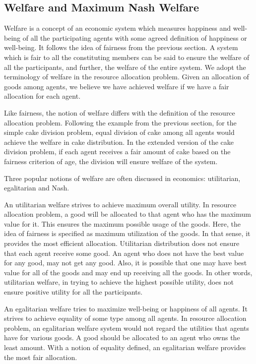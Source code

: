 \subsection{Welfare and Maximum Nash Welfare}
\label{section_welfare}
Welfare is a concept of an economic system which measures happiness and well-being of all the participating agents with some agreed definition of happiness or well-being. It follows the idea of fairness from the previous section. A system which is fair to all the constituting members can be said to ensure the welfare of all the participants, and further, the welfare of the entire system. We adopt the terminology of welfare in the resource allocation problem. Given an allocation of goods among agents, we believe we have achieved welfare if we have a fair allocation for each agent.

Like fairness, the notion of welfare differs with the definition of the resource allocation problem. Following the example from the previous section, for the simple cake division problem, equal division of cake among all agents would achieve the welfare in cake distribution. In the extended version of the cake division problem, if each agent receives a fair amount of cake based on the fairness criterion of age, the division will ensure welfare of the system.

Three popular notions of welfare are often discussed in economics: utilitarian, egalitarian and Nash.

An utilitarian welfare strives to achieve maximum overall utility. In resource allocation problem, a good will be allocated to that agent who has the maximum value for it. This ensures the maximum possible usage of the goods. Here, the idea of fairness is specified as maximum utilization of the goods. In that sense, it provides the most efficient allocation. Utilitarian distribution does not ensure that each agent receive some good. An agent who does not have the best value for any good, may not get any good. Also, it is possible that one may have best value for all of the goods and may end up receiving all the goods. In other words, utilitarian welfare, in trying to achieve the highest possible utility, does not ensure positive utility for all the participants.

An egalitarian welfare tries to maximize well-being or happiness of all agents. It strives to achieve equality of some type among all agents. In resource allocation problem, an egalitarian welfare system would not regard the utilities that agents have for various goods. A good should be allocated to an agent who owns the least amount. With a notion of equality defined, an egalitarian welfare provides the most fair allocation.


